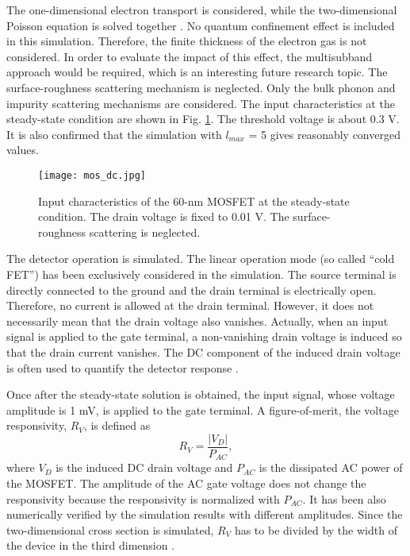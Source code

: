 \documentclass[journal]{IEEEtran}
\newcommand{\revision}[1]{{#1}}
\begin{document}
   The one-dimensional electron transport is considered, while the two-dimensional Poisson equation is solved together \cite{Hong2015}. 
\revision{No quantum confinement effect is included in this simulation.
   Therefore, the finite thickness of the electron gas \cite{Dahl1977,Fischetti2001a} is not considered.
   In order to evaluate the impact of this effect, the multisubband approach \cite{Jin 2008,Ruic2015} would be required, which is an interesting future research topic.}
   The surface-roughness scattering mechanism is neglected.
   Only the bulk phonon and impurity scattering mechanisms are considered.
   The input characteristics at the steady-state condition are shown in Fig. \ref{fig_mos_dc}. 
   The threshold voltage is about 0.3 V.
   It is also confirmed that the simulation with $l_{max}$ = 5 gives reasonably converged values. 

\begin{figure}[!t]
\centering
\texttt{[image: mos\_dc.jpg]}
\caption{Input characteristics of the 60-nm MOSFET at the steady-state condition. The drain voltage is fixed to 0.01 V.
The surface-roughness scattering is neglected.
}
\label{fig_mos_dc}
\end{figure}  

   The detector operation \cite{Dyakonov1996} is simulated.
   The linear operation mode (so called ``cold FET'') has been exclusively considered in the simulation.
\revision{The source terminal is directly connected to the ground and the drain terminal is electrically open.
   Therefore, no current is allowed at the drain terminal.
   However, it does not necessarily mean that the drain voltage also vanishes.
   Actually, when an input signal is applied to the gate terminal, a non-vanishing drain voltage is induced so that the drain current vanishes.
   The DC component of the induced drain voltage is often used to quantify the detector response \cite{Dyakonov1996}.}

   Once after the steady-state solution is obtained, the input signal, whose voltage amplitude is 1 mV, is applied to the gate terminal.  
   A figure-of-merit, the voltage responsivity, $R_V$, is defined as
\begin{equation}
R_V =  \frac{\left| V_D \right|}{P_{AC}},
\end{equation}   
where $V_D$ is the induced DC drain voltage and $P_{AC}$ is the dissipated AC power of the MOSFET.  
\revision{The amplitude of the AC gate voltage does not change the responsivity because the responsivity is normalized with $P_{AC}$.
   It has been also numerically verified by the simulation results with different amplitudes.}
   Since the two-dimensional cross section is simulated, $R_V$ has to be divided by the width of the device in the third dimension \cite{Jungemann2017}.
  
\end{document}
